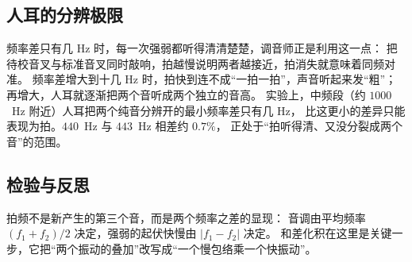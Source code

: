 \subsection{人耳的分辨极限}
频率差只有几 Hz 时，每一次强弱都听得清清楚楚，调音师正是利用这一点：
把待校音叉与标准音叉同时敲响，拍越慢说明两者越接近，拍消失就意味着同频对准。
频率差增大到十几 Hz 时，拍快到连不成“一拍一拍”，声音听起来发“粗”；
再增大，人耳就逐渐把两个音听成两个独立的音高。
实验上，中频段（约 $1000$~Hz 附近）人耳把两个纯音分辨开的最小频率差只有几 Hz，
比这更小的差异只能表现为拍。$440$~Hz 与 $443$~Hz 相差约 $0.7\%$，
正处于“拍听得清、又没分裂成两个音”的范围。

\subsection{检验与反思}
拍频不是新产生的第三个音，而是两个频率之差的显现：
音调由平均频率 $(f_1+f_2)/2$ 决定，强弱的起伏快慢由 $|f_1-f_2|$ 决定。
和差化积在这里是关键一步，它把“两个振动的叠加”改写成“一个慢包络乘一个快振动”。
